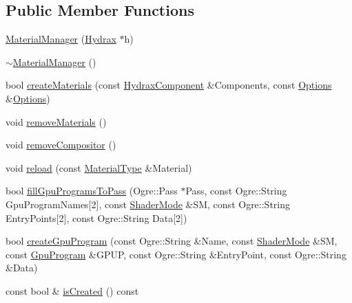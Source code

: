 \begin{CompactItemize}
\subsection*{Public Member Functions}
\begin{CompactItemize}
\item 
\hyperlink{class_hydrax_1_1_material_manager_22ad71a4c9f71a65d45922788abdbab6}{MaterialManager} (\hyperlink{class_hydrax_1_1_hydrax}{Hydrax} $\ast$h)
\item 
\hyperlink{class_hydrax_1_1_material_manager_071d2479a52e9d36ff25bbab8c09e728}{$\sim$MaterialManager} ()
\item 
bool \hyperlink{class_hydrax_1_1_material_manager_6aa7b0a92b824348577d506f7bcf581b}{createMaterials} (const \hyperlink{namespace_hydrax_e8e15abf83a51b0cf514c7d1a133650a}{HydraxComponent} \&Components, const \hyperlink{struct_hydrax_1_1_material_manager_1_1_options}{Options} \&\hyperlink{struct_hydrax_1_1_material_manager_1_1_options}{Options})
\item 
void \hyperlink{class_hydrax_1_1_material_manager_93baa6272c91d1be5ec9bef054a9bb0d}{removeMaterials} ()
\item 
void \hyperlink{class_hydrax_1_1_material_manager_160d27bd9ff0fac665ce5ce7c4e013e9}{removeCompositor} ()
\item 
void \hyperlink{class_hydrax_1_1_material_manager_2961836553f7a30a8baffb9e82f7216e}{reload} (const \hyperlink{class_hydrax_1_1_material_manager_cffd193405105e0f9f528cee40fdad15}{MaterialType} \&Material)
\item 
bool \hyperlink{class_hydrax_1_1_material_manager_9374e09a2d918becab5db16240d2b8e1}{fillGpuProgramsToPass} (Ogre::Pass $\ast$Pass, const Ogre::String GpuProgramNames\mbox{[}2\mbox{]}, const \hyperlink{class_hydrax_1_1_material_manager_cb13fe494b6960a96270e1ac293c48fb}{ShaderMode} \&SM, const Ogre::String EntryPoints\mbox{[}2\mbox{]}, const Ogre::String Data\mbox{[}2\mbox{]})
\item 
bool \hyperlink{class_hydrax_1_1_material_manager_c0f7c351a7df142a04023c3409d6d871}{createGpuProgram} (const Ogre::String \&Name, const \hyperlink{class_hydrax_1_1_material_manager_cb13fe494b6960a96270e1ac293c48fb}{ShaderMode} \&SM, const \hyperlink{class_hydrax_1_1_material_manager_a0cfb2fce7a409771c0751d04afa2514}{GpuProgram} \&GPUP, const Ogre::String \&EntryPoint, const Ogre::String \&Data)
\item 
const bool \& \hyperlink{class_hydrax_1_1_material_manager_b723890a6e4e198c1db2cf19dbe8be87}{isCreated} () const 
\item 

\end{CompactItemize}
\end{CompactItemize}
